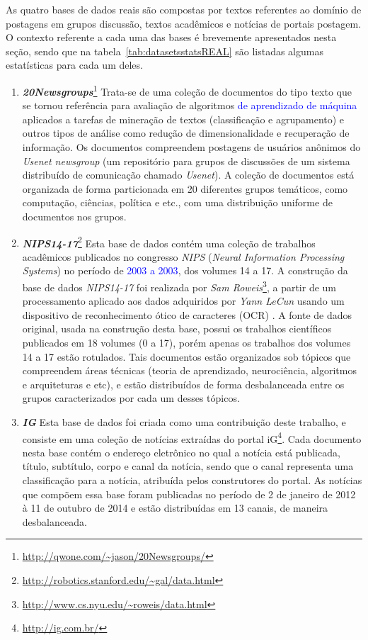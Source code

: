 \documentclass[
    12pt,                %
    oneside,            %
    a4paper,            %
    english,            %
    brazil                %
    ]{abntex2ppgsi}
\begin{document}
As quatro bases de dados reais são compostas por textos referentes ao domínio de postagens em grupos discussão, textos acadêmicos e notícias de portais postagem. O contexto referente a cada uma das bases é brevemente apresentados nesta seção, sendo que na tabela~\ref{tab:datasetsstatsREAL} são listadas algumas estatísticas para cada um deles.

\begin{enumerate}
    \item \textbf{\textit{20Newsgroups}}\footnote{\url{http://qwone.com/~jason/20Newsgroups/}} Trata-se de uma coleção de documentos do tipo texto que se tornou referência para avaliação de algoritmos \textcolor{blue}{de aprendizado de máquina} aplicados a tarefas de mineração de textos (classificação e agrupamento) e outros tipos de análise como redução de dimensionalidade e recuperação de informação. Os documentos compreendem postagens de usuários anônimos do \textit{Usenet newsgroup} (um repositório para grupos de discussões de um sistema distribuído de comunicação chamado \textit{Usenet}). A coleção de documentos está organizada de forma particionada em 20 diferentes grupos temáticos, como computação, ciências, política e etc., com uma distribuição uniforme de documentos nos grupos.

    \item \textbf{\textit{NIPS14-17}}\footnote{\url{http://robotics.stanford.edu/~gal/data.html}} Esta base de dados contém uma coleção de trabalhos acadêmicos publicados no congresso \textit{NIPS} (\textit{Neural Information Processing Systems}) no período de \textcolor{blue}{2003 a 2003}, dos volumes 14 a 17.
    A construção da base de dados \textit{NIPS14-17} foi realizada por \textit{Sam Roweis}\footnote{\url{http://www.cs.nyu.edu/~roweis/data.html}}, a partir de um processamento aplicado aos dados adquiridos por \textit{Yann LeCun} usando um dispositivo de reconhecimento ótico de caracteres (OCR) \cite{Chechik2007}. A fonte de dados original, usada na construção desta base, possui os trabalhos científicos publicados em 18 volumes (0 a 17), porém apenas os trabalhos dos volumes 14 a 17 estão rotulados. Tais documentos estão organizados sob tópicos que compreendem  áreas técnicas (teoria de aprendizado, neurociência, algoritmos e arquiteturas e etc), e estão distribuídos de forma desbalanceada entre os grupos caracterizados por cada um desses tópicos.

    \item \textbf{\textit{IG}} Esta base de dados foi criada como uma contribuição deste trabalho, e consiste em uma coleção de notícias extraídas do portal iG\footnote{\url{http://ig.com.br/}}.
    Cada documento nesta base contém o endereço eletrônico no qual a notícia está publicada, título, subtítulo, corpo e canal da notícia, sendo que o canal representa uma classificação para a notícia, atribuída pelos construtores do portal. As notícias que compõem essa base foram publicadas no período de 2 de janeiro de 2012 à 11 de outubro de 2014 e estão distribuídas em 13 canais, de maneira desbalanceada.


\end{enumerate}
\end{document}
